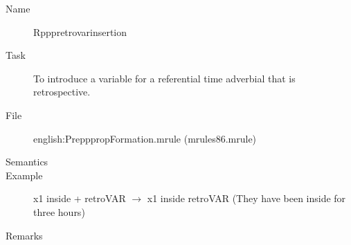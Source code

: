\begin{description}
\vspace{1 cm}
\begin{description}
\item[Name] Rpppretrovarinsertion
\item[Task] To introduce a variable for a referential time adverbial that is 
retrospective.
\item[File] english:PrepppropFormation.mrule (mrules86.mrule)
\item[Semantics]
\item[Example] x1 inside + retroVAR $\rightarrow$ x1 inside retroVAR (They have 
been inside for three hours)
\item[Remarks]
\end{description}

\end{description}

\newpage
